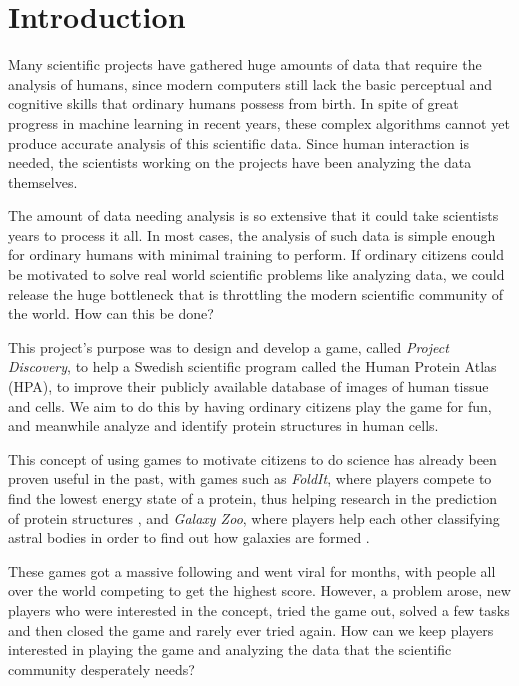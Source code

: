 \section{Introduction}\label{sec:introduction}

Many scientific projects have gathered huge amounts of data that require the analysis of humans, since modern computers still lack the basic perceptual and cognitive skills that ordinary humans possess from birth. In spite of great progress in machine learning in recent years, these complex algorithms cannot yet produce accurate analysis of this scientific data. Since human interaction is needed, the scientists working on the projects have been analyzing the data themselves.

The amount of data needing analysis is so extensive that it could take scientists years to process it all. In most cases, the analysis of such data is simple enough for ordinary humans with minimal training to perform. If ordinary citizens could be motivated to solve real world scientific problems like analyzing data, we could release the huge bottleneck that is throttling the modern scientific community of the world. How can this be done?

This project's purpose was to design and develop a game, called \emph{Project Discovery}, to help a Swedish scientific program called the Human Protein Atlas (HPA), to improve their publicly available database of images of human tissue and cells. We aim to do this by having ordinary citizens play the game for fun, and meanwhile analyze and identify protein structures in human cells.

This concept of using games to motivate citizens to do science has already been proven useful in the past, with games such as \emph{FoldIt}, where players compete to find the lowest energy state of a protein, thus helping research in the prediction of protein structures \cite{foldit}, and \emph{Galaxy Zoo}, where players help each other classifying astral bodies in order to find out how galaxies are formed \cite{galaxyzoo}.

These games got a massive following and went viral for months, with people all over the world competing to get the highest score. However, a problem arose, new players who were interested in the concept, tried the game out, solved a few tasks and then closed the game and rarely ever tried again. How can we keep players interested in playing the game and analyzing the data that the scientific community desperately needs?

